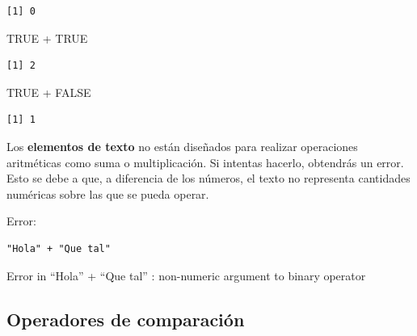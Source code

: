 \documentclass[
  letterpaper,
  DIV=11,
  numbers=noendperiod,
  twoside]{scrreprt}
\newenvironment{Shaded}{\begin{snugshade}}{\end{snugshade}}
\newcommand{\ConstantTok}[1]{\textcolor[rgb]{0.56,0.35,0.01}{#1}}
\newcommand{\SpecialCharTok}[1]{\textcolor[rgb]{0.37,0.37,0.37}{#1}}
\begin{document}
\begin{verbatim}
[1] 0
\end{verbatim}

\begin{Shaded}
\begin{Highlighting}[]
\ConstantTok{TRUE} \SpecialCharTok{+} \ConstantTok{TRUE}
\end{Highlighting}
\end{Shaded}

\begin{verbatim}
[1] 2
\end{verbatim}

\begin{Shaded}
\begin{Highlighting}[]
\ConstantTok{TRUE} \SpecialCharTok{+} \ConstantTok{FALSE}
\end{Highlighting}
\end{Shaded}

\begin{verbatim}
[1] 1
\end{verbatim}

\begin{tcolorbox}[enhanced jigsaw, titlerule=0mm, title=\textcolor{quarto-callout-caution-color}{\faFire}\hspace{0.5em}{Cuidado}, colback=white, opacityback=0, breakable, toprule=.15mm, left=2mm, leftrule=.75mm, colframe=quarto-callout-caution-color-frame, bottomtitle=1mm, rightrule=.15mm, opacitybacktitle=0.6, coltitle=black, arc=.35mm, bottomrule=.15mm, toptitle=1mm, colbacktitle=quarto-callout-caution-color!10!white]

Los \textbf{elementos de texto} no están diseñados para realizar
operaciones aritméticas como suma o multiplicación. Si intentas hacerlo,
obtendrás un error. Esto se debe a que, a diferencia de los números, el
texto no representa cantidades numéricas sobre las que se pueda operar.

\end{tcolorbox}

Error:

\begin{verbatim}
"Hola" + "Que tal"
\end{verbatim}

Error in ``Hola'' + ``Que tal'' : non-numeric argument to binary
operator

\subsection{Operadores de
comparación}\label{operadores-de-comparaciuxf3n}
\end{document}
